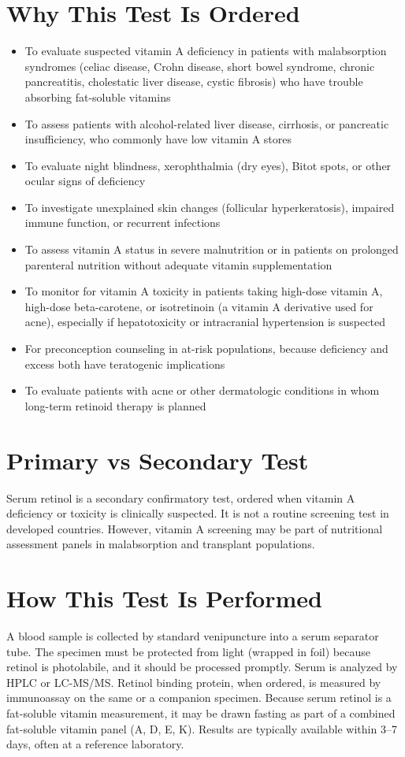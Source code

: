 \section*{Why This Test Is Ordered}
\begin{itemize}
  \item To evaluate suspected vitamin A deficiency in patients with malabsorption syndromes (celiac disease, Crohn disease, short bowel syndrome, chronic pancreatitis, cholestatic liver disease, cystic fibrosis) who have trouble absorbing fat-soluble vitamins
  \item To assess patients with alcohol-related liver disease, cirrhosis, or pancreatic insufficiency, who commonly have low vitamin A stores
  \item To evaluate night blindness, xerophthalmia (dry eyes), Bitot spots, or other ocular signs of deficiency
  \item To investigate unexplained skin changes (follicular hyperkeratosis), impaired immune function, or recurrent infections
  \item To assess vitamin A status in severe malnutrition or in patients on prolonged parenteral nutrition without adequate vitamin supplementation
  \item To monitor for vitamin A toxicity in patients taking high-dose vitamin A, high-dose beta-carotene, or isotretinoin (a vitamin A derivative used for acne), especially if hepatotoxicity or intracranial hypertension is suspected
  \item For preconception counseling in at-risk populations, because deficiency and excess both have teratogenic implications
  \item To evaluate patients with acne or other dermatologic conditions in whom long-term retinoid therapy is planned
\end{itemize}

\section*{Primary vs Secondary Test}
Serum retinol is a secondary confirmatory test, ordered when vitamin A deficiency or toxicity is clinically suspected. It is not a routine screening test in developed countries. However, vitamin A screening may be part of nutritional assessment panels in malabsorption and transplant populations.

\section*{How This Test Is Performed}
A blood sample is collected by standard venipuncture into a serum separator tube. The specimen must be protected from light (wrapped in foil) because retinol is photolabile, and it should be processed promptly. Serum is analyzed by HPLC or LC-MS/MS. Retinol binding protein, when ordered, is measured by immunoassay on the same or a companion specimen. Because serum retinol is a fat-soluble vitamin measurement, it may be drawn fasting as part of a combined fat-soluble vitamin panel (A, D, E, K). Results are typically available within 3--7 days, often at a reference laboratory.

